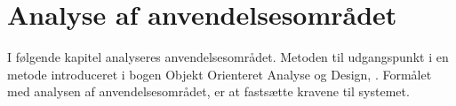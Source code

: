 \chapter{Analyse af anvendelsesområdet}
\label{chap:analyseafao}

I følgende kapitel analyseres anvendelsesområdet. Metoden til udgangspunkt i en metode introduceret i bogen Objekt Orienteret Analyse og Design, \cite[p. ~113]{ooad}. Formålet med analysen af anvendelsesområdet, er at fastsætte kravene til \Foodl systemet. 




